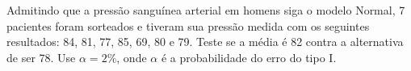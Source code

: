 %
%


\begin{exercicioBanco}[\valorquestao]
    Admitindo que a pressão sanguínea arterial em homens siga o modelo Normal, 7 pacientes foram sorteados e tiveram sua pressão medida com os seguintes resultados: 84, 81, 77, 85, 69, 80 e 79. Teste se a média é 82 contra a alternativa de ser 78. Use $\alpha = 2\%$, onde \(\alpha\) é a probabilidade do erro do tipo I.
\end{exercicioBanco}

